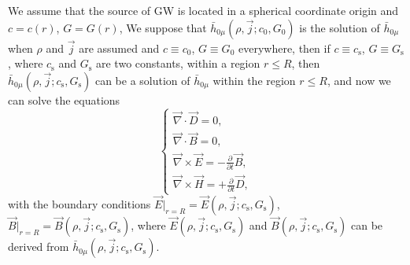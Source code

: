 \documentclass{article}
\def\p{\partial}
\begin{document}
We assume that the source of GW is located in a spherical coordinate origin and $c=c(r)$, $G=G(r)$, We suppose that $\bar{h}_{0 \mu}(\rho,\vec{j};c_0,G_0)$ is the solution of $\bar{h}_{0 \mu}$ when $\rho$ and $\vec{j}$ are assumed and $c\equiv c_0$, $G\equiv G_0$ everywhere, then if $c\equiv c_\text{s}$, $G\equiv G_\text{s}$, where $c_\text{s}$ and $G_\text{s}$ are two constants, within a region $r\leq R$, then $\bar{h}_{0 \mu}(\rho,\vec{j};c_\text{s},G_\text{s})$ can be a solution of $\bar{h}_{0 \mu}$ within the region $r\leq R$, and now we can solve the equations
\begin{equation}
    \begin{cases}
        \vec{\nabla}\cdot\vec{D}=0,\\
        \vec{\nabla}\cdot\vec{B}=0,\\
        \vec{\nabla}\times\vec{E}=-\frac{\p}{\p t}\vec{B},\\
        \vec{\nabla}\times\vec{H}=+\frac{\p}{\p t}\vec{D},
    \end{cases}
\end{equation}
with the boundary conditions $\vec{E}|_{r=R}=\vec{E}(\rho,\vec{j};c_\text{s},G_\text{s})$, $\vec{B}|_{r=R}=\vec{B}(\rho,\vec{j};c_\text{s},G_\text{s})$, where $\vec{E}(\rho,\vec{j};c_\text{s},G_\text{s})$ and $\vec{B}(\rho,\vec{j};c_\text{s},G_\text{s})$ can be derived from $\bar{h}_{0 \mu}(\rho,\vec{j};c_\text{s},G_\text{s})$.
\end{document}
